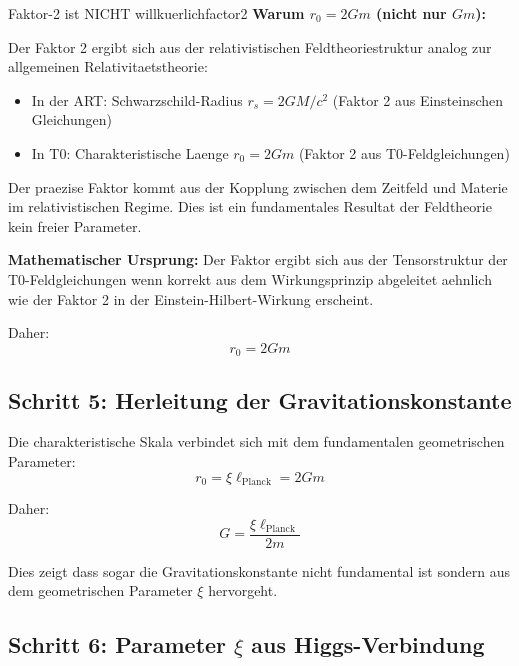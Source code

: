 \documentclass[12pt,a4paper]{article}
\begin{document}
	\begin{criticism}{Faktor-2 ist NICHT willkuerlich}{factor2}
		\textbf{Warum $r_0 = 2Gm$ (nicht nur $Gm$):}
		
		Der Faktor 2 ergibt sich aus der relativistischen Feldtheoriestruktur analog zur allgemeinen Relativitaetstheorie:
		\begin{itemize}
			\item In der ART: Schwarzschild-Radius $r_s = 2GM/c^2$ (Faktor 2 aus Einsteinschen Gleichungen)
			\item In T0: Charakteristische Laenge $r_0 = 2Gm$ (Faktor 2 aus T0-Feldgleichungen)
		\end{itemize}
		
		Der praezise Faktor kommt aus der Kopplung zwischen dem Zeitfeld und Materie im relativistischen Regime. Dies ist ein fundamentales Resultat der Feldtheorie kein freier Parameter.
		
		\textbf{Mathematischer Ursprung:} Der Faktor ergibt sich aus der Tensorstruktur der T0-Feldgleichungen wenn korrekt aus dem Wirkungsprinzip abgeleitet aehnlich wie der Faktor 2 in der Einstein-Hilbert-Wirkung erscheint.
	\end{criticism}
	
	Daher:
	\begin{equation}
		\boxed{r_0 = 2Gm}
		\label{eq:characteristic_length}
	\end{equation}
	
	\subsection{Schritt 5: Herleitung der Gravitationskonstante}
	
	Die charakteristische Skala verbindet sich mit dem fundamentalen geometrischen Parameter:
	\begin{equation}
		r_0 = \xi \ell_{\text{Planck}} = 2Gm
	\end{equation}
	
	Daher:
	\begin{equation}
		\boxed{G = \frac{\xi \ell_{\text{Planck}}}{2m}}
		\label{eq:G_derivation}
	\end{equation}
	
	Dies zeigt dass sogar die Gravitationskonstante nicht fundamental ist sondern aus dem geometrischen Parameter $\xi$ hervorgeht.
	
	\subsection{Schritt 6: Parameter $\xi$ aus Higgs-Verbindung}
	
\end{document}
